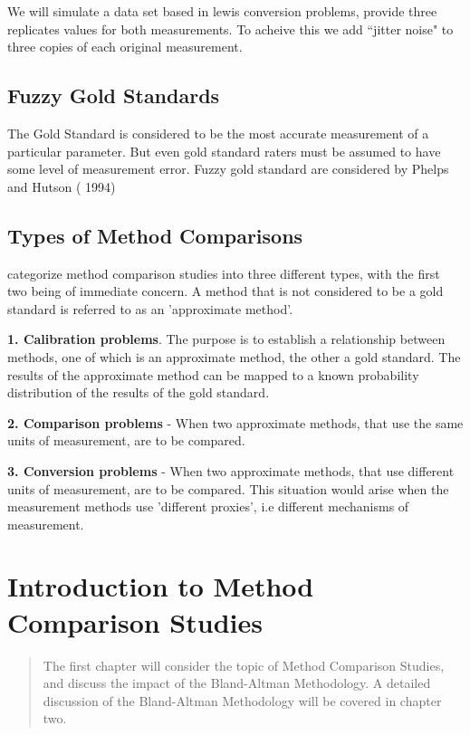 \documentclass[12pt, a4paper]{report}
\theoremstyle{plain}
\theoremstyle{definition}
\theoremstyle{remark}
\begin{document}
We will simulate a data set based in lewis conversion problems, provide three replicates values for both measurements. To acheive this we add ``jitter noise" to three copies of each original measurement.


	\section{Fuzzy Gold Standards} The Gold Standard is considered to be the most
	accurate measurement of a particular parameter. But even gold
	standard raters must be assumed to have some level of measurement
	error. Fuzzy gold standard are considered by Phelps and Hutson (
	1994)
	
	
	\section{Types of Method Comparisons} \citet{Lewis} categorize
	method comparison studies into three different types, with the
	first two being of immediate concern. A method that is not considered to be a gold standard is referred
	to as an 'approximate method'.
	
	\textbf{1. Calibration problems}. The purpose is to establish a
	relationship between methods, one of which is an approximate
	method, the other a gold standard. The results of the approximate
	method can be mapped to a known probability distribution of the
	results of the gold standard.
	
	\smallskip
	\textbf{2. Comparison problems} - When two approximate methods,
	that use the same units of measurement, are to be compared.
	
	\smallskip
	\textbf{3. Conversion problems} -  When two approximate methods,
	that use different units of measurement, are to be compared. This
	situation would arise when the measurement methods use 'different
	proxies', i.e different mechanisms of measurement.

	

	\chapter{Introduction to Method Comparison Studies}
	\begin{abstract}
		The first chapter will consider the topic of Method Comparison Studies, and discuss the impact of the Bland-Altman Methodology. A detailed discussion of the Bland-Altman Methodology will be covered in chapter two.
	\end{abstract}
	
\end{document}

